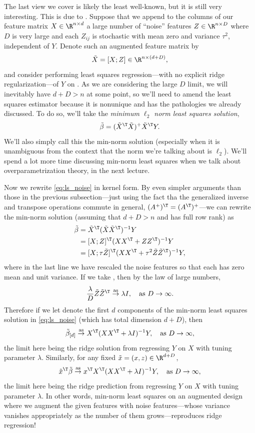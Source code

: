 \documentclass{article}
\begin{document}
The last view we cover is likely the least well-known, but it is still very 
interesting. This is due to \citet{kobak2020optimal}. Suppose that we append to
the columns of our feature matrix $X \in \R^{n \times d}$ a large number of
``noise'' features $Z \in \R^{n \times D}$ where $D$ is very large and each
$Z_{ij}$ is stochastic with mean zero and variance $\tau^2$, independent of
$Y$. Denote such an augmented feature matrix by
\[
\tilde X = [X; Z] \in \R^{n \times (d+D)},
\]
and consider performing least squares regression---with no explicit ridge
regularization---of $Y$ on . As we are considering the large
$D$ limit, we will inevitably have $d+D > n$ at some point, so we'll need to
amend the least squares estimator because it is nonunique and has the
pathologies we already discussed. To do so, we'll take the \emph{minimum 
  $\ell_2$ norm least squares solution}, 
\begin{equation}
\label{eq:ls_noise}
\tilde\beta = (\tilde X^\T \tilde X)^+ \tilde X^\T Y.
\end{equation}
We'll also simply call this the min-norm solution (especially when it is
unambiguous from the context that the norm we're talking about is
$\ell_2$). We'll spend a lot more time discussing min-norm least squares when we
talk about overparametrization theory, in the next lecture.  

Now we rewrite \eqref{eq:ls_noise} in kernel form. By even simpler arguments
than those in the previous subsection---just using the fact tha the generalized 
inverse and transpose operations commute in general, $(A^+)^\T = (A^\T)^+$---we 
can rewrite the min-norm solution (assuming that $d+D > n$ and  has full row rank) as  
\begin{align*}
\tilde\beta &= \tilde X^\T (\tilde X \tilde X^\T)^{-1} Y \\
&= [X; Z]^\T (XX^\T + ZZ^\T)^{-1} Y \\
&= [X; \tau \tilde Z]^\T (XX^\T + \tau^2 \tilde Z \tilde Z^\T)^{-1} Y,  
\end{align*}
where in the last line we have rescaled the noise features so that each
 has zero mean and unit variance. If 
we take , then by the law of large numbers, 
\[
\frac{\lambda}{D} \tilde Z \tilde Z^\T \asto \lambda I, \quad \text{as $D \to
  \infty$}. 
\]
Therefore if we let \smash{$\tilde \beta_{[d]}$} denote the first $d$ components
of the min-norm least squares solution in \eqref{eq:ls_noise} (which has total
dimension $d+D$), then   
\[
\tilde \beta_{[d]} \asto X^\T (XX^\T + \lambda I)^{-1} Y, \quad \text{as $D \to 
  \infty$},
\]
the limit here being the ridge solution from regressing $Y$ on $X$ with tuning
parameter $\lambda$. Similarly, for any fixed $\tilde x = (x, z) \in \R^{d+D}$,  
\[
\tilde x^\T \tilde \beta \asto x^\T X^\T (XX^\T + \lambda I)^{-1} Y, \quad
\text{as $D \to \infty$},
\]
the limit here being the ridge prediction from regressing $Y$ on $X$ with tuning
parameter $\lambda$. In other words, min-norm least squares on an augmented
design where we augment the given features with noise features---whose variance
vanishes appropriately as the number of them grows---reproduces ridge
regression! 
\end{document}
